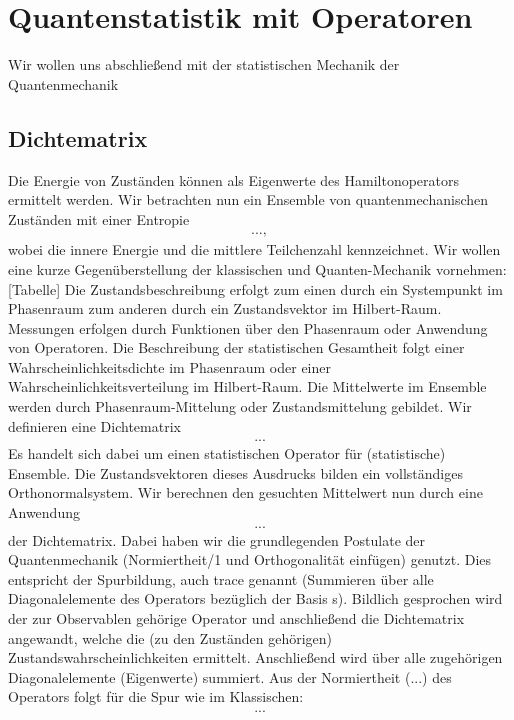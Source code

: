 \chapter{Quantenstatistik mit Operatoren}
Wir wollen uns abschließend mit der statistischen Mechanik der Quantenmechanik 
\section{Dichtematrix}
Die Energie von Zuständen können als Eigenwerte des Hamiltonoperators ermittelt werden.
Wir betrachten nun ein Ensemble von quantenmechanischen Zuständen mit einer Entropie 
\begin{align*}
    ...,
\end{align*}
wobei die innere Energie und die mittlere Teilchenzahl kennzeichnet.
Wir wollen eine kurze Gegenüberstellung der klassischen und Quanten-Mechanik vornehmen:
[Tabelle]
Die Zustandsbeschreibung erfolgt zum einen durch ein Systempunkt im Phasenraum zum anderen durch ein Zustandsvektor im Hilbert-Raum.
Messungen erfolgen durch Funktionen über den Phasenraum oder Anwendung von Operatoren. Die Beschreibung der statistischen Gesamtheit folgt einer Wahrscheinlichkeitsdichte im Phasenraum oder einer Wahrscheinlichkeitsverteilung im Hilbert-Raum. Die Mittelwerte im Ensemble werden durch Phasenraum-Mittelung oder Zustandsmittelung gebildet.
Wir definieren eine Dichtematrix 
\begin{align*}
    ...
\end{align*}
Es handelt sich dabei um einen statistischen Operator für (statistische) Ensemble. Die Zustandsvektoren dieses Ausdrucks bilden ein vollständiges Orthonormalsystem. 
Wir berechnen den gesuchten Mittelwert nun durch eine Anwendung 
\begin{align*}
    ...
\end{align*}
der Dichtematrix. Dabei haben wir die grundlegenden Postulate der Quantenmechanik (Normiertheit/1 und Orthogonalität einfügen) genutzt.
Dies entspricht der Spurbildung, auch trace genannt (Summieren über alle Diagonalelemente des Operators bezüglich der Basis s). Bildlich gesprochen wird der zur Observablen gehörige Operator und anschließend die Dichtematrix angewandt, welche die (zu den Zuständen gehörigen) Zustandswahrscheinlichkeiten ermittelt. Anschließend wird über alle zugehörigen Diagonalelemente (Eigenwerte) summiert. Aus der Normiertheit (...) des Operators folgt für die Spur wie im Klassischen:
\begin{align*}
    ...
\end{align*}
